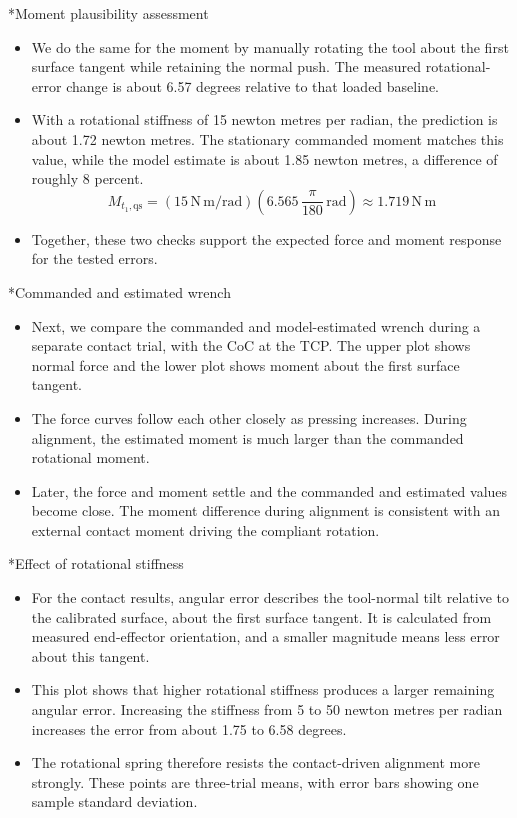 \documentclass[12pt,a4paper]{article}
\makeatletter
\renewcommand\section{\@startsection{section}{1}{0pt}{14pt}{6pt}{\normalfont\Large\bfseries\color{navy}}}
\makeatother
\begin{document}
\section*{Moment plausibility assessment}
\begin{itemize}
\item We do the same for the moment by manually rotating the tool about the first surface tangent while retaining the normal push. The measured rotational-error change is about 6.57 degrees relative to that loaded baseline.
\item With a rotational stiffness of 15 newton metres per radian, the prediction is about 1.72 newton metres. The stationary commanded moment matches this value, while the model estimate is about 1.85 newton metres, a difference of roughly 8 percent.
\[
M_{t_1,\mathrm{qs}}=(15\,\mathrm{N\,m/rad})\left(6.565\,\frac{\pi}{180}\,\mathrm{rad}\right)\approx1.719\,\mathrm{N\,m}
\]
\item Together, these two checks support the expected force and moment response for the tested errors.
\end{itemize}

\section*{Commanded and estimated wrench}
\begin{itemize}
\item Next, we compare the commanded and model-estimated wrench during a separate contact trial, with the CoC at the TCP. The upper plot shows normal force and the lower plot shows moment about the first surface tangent.
\item The force curves follow each other closely as pressing increases. During alignment, the estimated moment is much larger than the commanded rotational moment.
\item Later, the force and moment settle and the commanded and estimated values become close. The moment difference during alignment is consistent with an external contact moment driving the compliant rotation.
\end{itemize}

\section*{Effect of rotational stiffness}
\begin{itemize}
\item For the contact results, angular error describes the tool-normal tilt relative to the calibrated surface, about the first surface tangent. It is calculated from measured end-effector orientation, and a smaller magnitude means less error about this tangent.
\item This plot shows that higher rotational stiffness produces a larger remaining angular error. Increasing the stiffness from 5 to 50 newton metres per radian increases the error from about 1.75 to 6.58 degrees.
\item The rotational spring therefore resists the contact-driven alignment more strongly. These points are three-trial means, with error bars showing one sample standard deviation.
\end{itemize}
\end{document}
